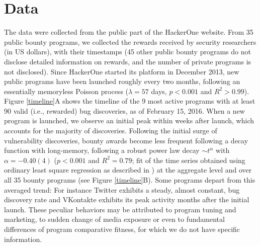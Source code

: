 \section{Data}
\label{sec:data}
The data were collected from the public part of the HackerOne website. From 35 public bounty programs, we collected the rewards received by security researchers (in US dollars), with their timestamps (45 other public bounty programs do not disclose detailed information on rewards, and the number of private programs is not disclosed). Since HackerOne started its platform in December 2013, new public programs have been launched roughly every two months, following an essentially memoryless Poisson process ($\lambda = 57$ days, $p < 0.001$ and $R^2 > 0.99$). Figure \ref{timeline}A shows the timeline of the 9 most active programs with at least 90 valid (i.e., rewarded) bug discoveries, as of February 15, 2016. When a new program is launched, we observe an initial peak within weeks after launch, which accounts for the majority of discoveries. Following the initial surge of vulnerability discoveries, bounty awards become less frequent following a decay function with long-memory, following a robust power law decay $\sim t^{\alpha}$ with $\alpha = -0.40(4)$ ($p < 0.001$ and $R^2 = 0.79$; fit of the time series obtained using ordinary least square regression as described in \cite{maillart2011quantification}) at the aggregate level and over all 35 bounty programs (see Figure \ref{timeline}B). Some programs depart from this averaged trend: For instance Twitter exhibits a steady, almost constant, bug discovery rate and VKontakte exhibits its peak activity months after the initial launch. These peculiar behaviors may be attributed to program tuning and marketing, to sudden change of media exposure or even to fundamental differences of program comparative fitness, for which we do not have specific information.\\

